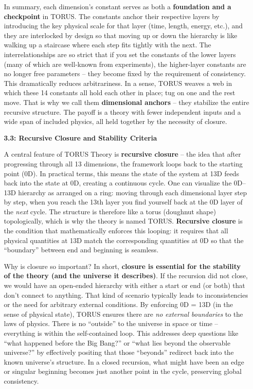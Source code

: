 \documentclass[
]{article}
\begin{document}
In summary, each dimension's constant serves as both a
\textbf{foundation and a checkpoint} in TORUS. The constants anchor
their respective layers by introducing the key physical scale for that
layer (time, length, energy, etc.), and they are interlocked by design
so that moving up or down the hierarchy is like walking up a staircase
where each step fits tightly with the next. The interrelationships are
so strict that if you set the constants of the lower layers (many of
which are well-known from experiments), the higher-layer constants are
no longer free parameters -- they become fixed by the requirement of
consistency\hspace{0pt}. This dramatically reduces arbitrariness. In a
sense, TORUS weaves a web in which these 14 constants all hold each
other in place; tug on one and the rest move. That is why we call them
\textbf{dimensional anchors} -- they stabilize the entire recursive
structure. The payoff is a theory with fewer independent inputs and a
wide span of included physics, all held together by the necessity of
closure.

\textbf{3.3: Recursive Closure and Stability Criteria}

A central feature of TORUS Theory is \textbf{recursive closure} -- the
idea that after progressing through all 13 dimensions, the framework
loops back to the starting point (0D). In practical terms, this means
the state of the system at 13D feeds back into the state at 0D, creating
a continuous cycle. One can visualize the 0D--13D hierarchy as arranged
on a ring: moving through each dimensional layer step by step, when you
reach the 13th layer you find yourself back at the 0D layer of the
\emph{next} cycle. The structure is therefore like a torus (doughnut
shape) topologically, which is why the theory is named TORUS.
\textbf{Recursive closure} is the condition that mathematically enforces
this looping: it requires that all physical quantities at 13D match the
corresponding quantities at 0D so that the ``boundary'' between end and
beginning is seamless\hspace{0pt}.

Why is closure so important? In short, \textbf{closure is essential for
the stability of the theory (and the universe it describes)}. If the
recursion did not close, we would have an open-ended hierarchy with
either a start or end (or both) that don't connect to anything. That
kind of scenario typically leads to inconsistencies or the need for
arbitrary external conditions. By enforcing 0D = 13D (in the sense of
physical state), TORUS ensures there are \emph{no external boundaries}
to the laws of physics. There is no ``outside'' to the universe in space
or time -- everything is within the self-contained loop. This addresses
deep questions like ``what happened before the Big Bang?'' or ``what
lies beyond the observable universe?'' by effectively positing that
those ``beyonds'' redirect back into the known universe's
structure\hspace{0pt}. In a closed recursion, what might have been an
edge or singular beginning becomes just another point in the cycle,
preserving global consistency.
\end{document}
